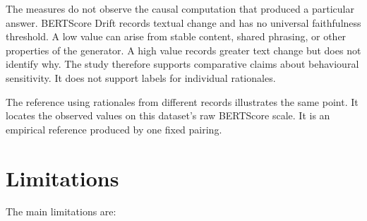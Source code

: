 The measures do not observe the causal computation that produced a particular
answer. BERTScore Drift records textual change and has no universal faithfulness
threshold. A low value can arise from stable content, shared phrasing, or other
properties of the generator. A high value records greater text change but does not identify why. The study
therefore supports comparative claims about
behavioural sensitivity. It does not support labels for individual rationales.

The reference using rationales from different records illustrates the same
point. It locates the observed values on this dataset's raw BERTScore scale. It
is an empirical reference produced by one fixed pairing.

\section{Limitations}
\label{sec:discussion-limitations}

The main limitations are:

